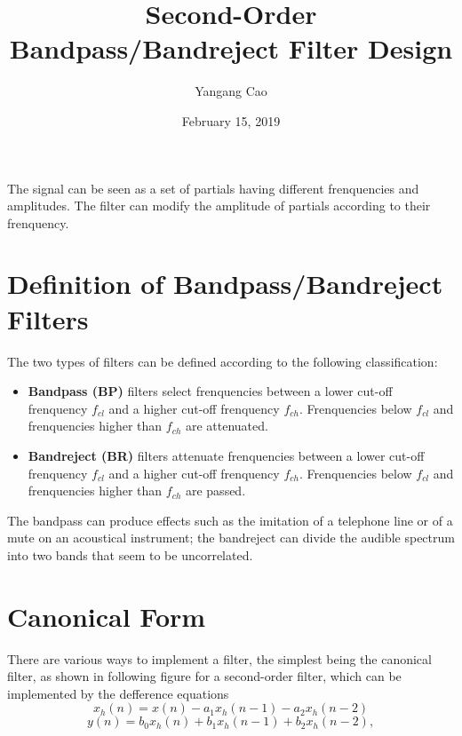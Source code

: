 \documentclass[10pt,a4paper,oneside]{article}
\author{Yangang Cao}
\date{February 15, 2019}
\begin{document}
\title{Second-Order Bandpass/Bandreject Filter Design}
\maketitle 

The signal can be seen as a set of partials having different frenquencies and amplitudes. The filter can modify the amplitude of partials according to their frenquency.

\section{Definition of Bandpass/Bandreject Filters}

The two types of filters can be defined according to the following classification:

\begin{itemize}
	\item {\bfseries Bandpass (BP)} filters select frenquencies between a lower cut-off frenquency $f_{cl}$ and a higher cut-off frenquency $f_{ch}$. Frenquencies below $f_{cl}$ and frenquencies higher than $f_{ch}$ are attenuated.
	\item {\bfseries Bandreject (BR)} filters attenuate frenquencies between a lower cut-off frenquency $f_{cl}$ and a higher cut-off frenquency $f_{ch}$. Frenquencies below $f_{cl}$ and frenquencies higher than $f_{ch}$ are passed.
\end{itemize}

The bandpass can produce effects such as the imitation of a telephone line or of a mute on an acoustical instrument; the bandreject can divide the audible spectrum into two bands that seem to be uncorrelated.

\section{Canonical Form}
There are various ways to implement a filter, the simplest being the canonical filter, as shown in following figure for a second-order filter, which can be implemented by the defference equations
\[
x_h(n) = x(n) - a_1x_h(n-1) - a_2x_h(n-2)
\]
\[
y(n) = b_0x_h(n) + b_1x_h(n-1) + b_2x_h(n-2),
\]
\end{document}
